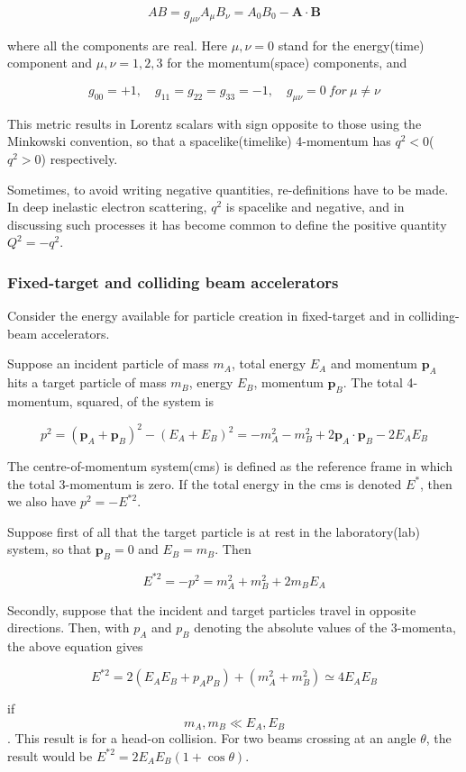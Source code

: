 \documentclass[en, device=normal]{elegantnote}
\begin{document}
$$AB=g_{\mu\nu}A_\mu B_\nu=A_0B_0-\textbf{A}\cdot\textbf{B}$$

where all the components are real. Here $\mu,\nu =0$ stand for the energy(time) component 
and $\mu,\nu=1,2,3$ for the momentum(space) components, and 

$$g_{00}=+1,\quad g_{11}=g_{22}=g_{33}=-1,\quad g_{\mu\nu}=0\ for\ \mu\neq\nu$$

This metric results in Lorentz scalars with sign opposite to those using the Minkowski 
convention, so that a spacelike(timelike) 4-momentum has $q^2<0$($q^2>0$) respectively.

Sometimes, to avoid writing negative quantities, re-definitions have to be made. In deep 
inelastic electron scattering, $q^2$ is spacelike and negative, and in discussing such 
processes it has become common to define the positive quantity $Q^2=-q^2$.

\subsubsection{Fixed-target and colliding beam accelerators}

Consider the energy available for particle creation in fixed-target and in colliding-beam 
accelerators.

Suppose an incident particle of mass $m_A$, total energy $E_A$ and momentum $\textbf{p}_A$ 
hits a target particle of mass $m_B$, energy $E_B$, momentum $\textbf{p}_B$. The total 
4-momentum, squared, of the system is 

$$p^2=(\textbf{p}_A+\textbf{p}_B)^2-(E_A+E_B)^2=-m_A^2-m_B^2+2\textbf{p}_A\cdot\textbf{p}_B-2E_AE_B$$

The centre-of-momentum system(cms) is defined as the reference frame in which the total 
3-momentum is zero. If the total energy in the cms is denoted $E^*$, then we also have $p^2=-E^{*2}$.

Suppose first of all that the target particle is at rest in the laboratory(lab) system, so that $\textbf{p}_B=0$ 
and $E_B=m_B$. Then 

$$E^{*2}=-p^2=m_A^2+m_B^2+2m_BE_A$$

Secondly, suppose that the incident and target particles travel in opposite directions. 
Then, with $p_A$ and $p_B$ denoting the absolute values of the 3-momenta, the above 
equation gives 

$$E^{*2}=2(E_AE_B+p_Ap_B)+(m_A^2+m_B^2)\simeq 4E_AE_B$$

if $$m_A,m_B\ll E_A,E_B$$. This result is for a head-on collision. For two beams crossing at an 
angle $\theta$, the result would be $E^{*2}=2E_AE_B(1+\cos\theta)$.
\end{document}
